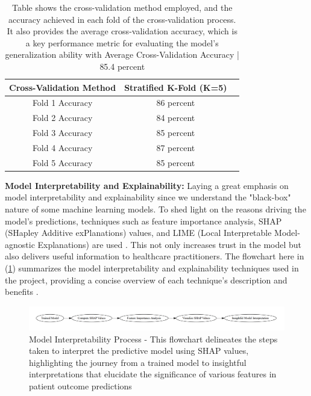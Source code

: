 \documentclass[manuscript,screen,]{acmart}
\begin{document}
\begin{table}[h]
    \centering
    \begin{tabular}{|c|c|c|}
    \hline
    Cross-Validation Method & Stratified K-Fold (K=5)\\
    \hline
    Fold 1 Accuracy & 86 percent\\
    \hline
    Fold 2 Accuracy & 84 percent\\
    \hline
    Fold 3 Accuracy & 85 percent\\
    \hline
    Fold 4 Accuracy & 87 percent\\
    \hline
    Fold 5 Accuracy & 85 percent\\
    \hline
    \end{tabular}
    \caption{Table shows the cross-validation method employed, and the accuracy achieved in each fold of the cross-validation process. It also provides the average cross-validation accuracy, which is a key performance metric for evaluating the model's generalization ability with Average Cross-Validation Accuracy | 85.4 percent}
    \label{tab: cross-validation method employed}
\end{table}


\newpage\textbf{Model Interpretability and Explainability:}
Laying a great emphasis on model interpretability and explainability since we understand the "black-box" nature of some machine learning models. To shed light on the reasons driving the model's predictions, techniques such as feature importance analysis, SHAP (SHapley Additive exPlanations) values, and LIME (Local Interpretable Model-agnostic Explanations) are used \cite{Zhang2022Interpretable}. This not only increases trust in the model but also delivers useful information to healthcare practitioners. The flowchart here in (\ref{fig: Model Interpretability Process}) summarizes the model interpretability and explainability techniques used in the project, providing a concise overview of each technique's description and benefits \cite{Miller2019ExplanationAI}.

\begin{figure}
    \centering
    \includegraphics[width=1\linewidth]{Images//Sections/Model Interpretability.png}
    \caption{Model Interpretability Process - This flowchart delineates the steps taken to interpret the predictive model using SHAP values, highlighting the journey from a trained model to insightful interpretations that elucidate the significance of various features in patient outcome predictions}
    \label{fig: Model Interpretability Process}
\end{figure}
\end{document}
